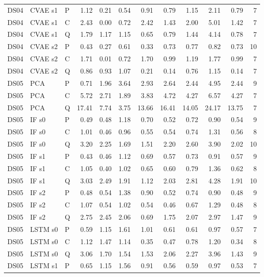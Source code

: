 \documentclass[10pt]{article}
\begin{document}
{\begin{longtable}{lllrrrrrrrrr}
DS04 & CVAE s1 & P & 1.12 & 0.21 & 0.54 & 0.91 & 0.79 & 1.15 & 2.11 & 0.79 & 7 \\
DS04 & CVAE s1 & C & 2.43 & 0.00 & 0.72 & 2.42 & 1.43 & 2.00 & 5.01 & 1.42 & 7 \\
DS04 & CVAE s1 & Q & 1.79 & 1.17 & 1.15 & 0.65 & 0.79 & 1.44 & 4.14 & 0.78 & 7 \\
DS04 & CVAE s2 & P & 0.43 & 0.27 & 0.61 & 0.33 & 0.73 & 0.77 & 0.82 & 0.73 & 10 \\
DS04 & CVAE s2 & C & 1.71 & 0.01 & 0.72 & 1.70 & 0.99 & 1.19 & 1.77 & 0.99 & 7 \\
DS04 & CVAE s2 & Q & 0.86 & 0.93 & 1.07 & 0.21 & 0.14 & 0.76 & 1.15 & 0.14 & 7 \\
\midrule
DS05 & PCA & P & 0.71 & 1.96 & 3.64 & 2.93 & 2.64 & 2.44 & 4.95 & 2.44 & 9 \\
DS05 & PCA & C & 5.72 & 2.71 & 1.89 & 3.83 & 4.72 & 4.27 & 6.57 & 4.27 & 7 \\
DS05 & PCA & Q & 17.41 & 7.74 & 3.75 & 13.66 & 16.41 & 14.05 & 24.17 & 13.75 & 7 \\
DS05 & IF s0 & P & 0.49 & 0.48 & 1.18 & 0.70 & 0.52 & 0.72 & 0.90 & 0.54 & 9 \\
DS05 & IF s0 & C & 1.01 & 0.46 & 0.96 & 0.55 & 0.54 & 0.74 & 1.31 & 0.56 & 8 \\
DS05 & IF s0 & Q & 3.20 & 2.25 & 1.69 & 1.51 & 2.20 & 2.60 & 3.90 & 2.02 & 10 \\
DS05 & IF s1 & P & 0.43 & 0.46 & 1.12 & 0.69 & 0.57 & 0.73 & 0.91 & 0.57 & 9 \\
DS05 & IF s1 & C & 1.05 & 0.40 & 1.02 & 0.65 & 0.60 & 0.79 & 1.36 & 0.62 & 8 \\
DS05 & IF s1 & Q & 3.03 & 2.49 & 1.91 & 1.12 & 2.03 & 2.81 & 4.28 & 1.91 & 10 \\
DS05 & IF s2 & P & 0.48 & 0.54 & 1.38 & 0.90 & 0.52 & 0.74 & 0.90 & 0.48 & 9 \\
DS05 & IF s2 & C & 1.07 & 0.54 & 1.02 & 0.54 & 0.46 & 0.67 & 1.29 & 0.48 & 8 \\
DS05 & IF s2 & Q & 2.75 & 2.45 & 2.06 & 0.69 & 1.75 & 2.07 & 2.97 & 1.47 & 9 \\
DS05 & LSTM s0 & P & 0.59 & 1.15 & 1.61 & 1.01 & 0.61 & 0.61 & 0.97 & 0.57 & 7 \\
DS05 & LSTM s0 & C & 1.12 & 1.47 & 1.14 & 0.35 & 0.47 & 0.78 & 1.20 & 0.34 & 8 \\
DS05 & LSTM s0 & Q & 3.06 & 1.70 & 1.54 & 1.53 & 2.06 & 2.27 & 3.96 & 1.43 & 9 \\
DS05 & LSTM s1 & P & 0.65 & 1.15 & 1.56 & 0.91 & 0.56 & 0.59 & 0.97 & 0.53 & 7 \\

\end{longtable}}
\end{document}
